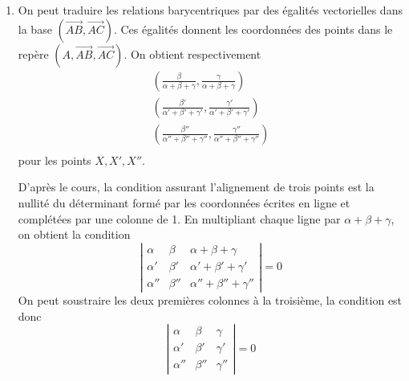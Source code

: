 \begin{enumerate}
  \item On peut traduire les relations barycentriques par des {\'e}galit{\'e}s
  vectorielles dans la base $(\overrightarrow{AB},
  \overrightarrow{AC})$. Ces {\'e}galit{\'e}s donnent les coordonn{\'e}es des
  points dans le rep{\`e}re $(A,\overrightarrow{AB},
  \overrightarrow{AC})$. On obtient respectivement
  \begin{eqnarray*}
(\frac{\beta}{\alpha+\beta+\gamma},\frac{\gamma}{\alpha+\beta+\gamma})\\
(\frac{\beta'}{\alpha'+\beta'+\gamma'},\frac{\gamma'}{\alpha'+\beta'+\gamma'})\\
(\frac{\beta''}{\alpha''+\beta''+\gamma''},\frac{\gamma''}{\alpha''+\beta''+\gamma''})\\
  \end{eqnarray*}
  pour les points $X,X',X''$.

  D'apr{\`e}s le cours, la condition assurant l'alignement de trois
  points est la nullit{\'e} du d{\'e}terminant form{\'e} par les coordonn{\'e}es
  {\'e}crites en ligne et compl{\'e}t{\'e}es par une colonne de 1. En
  multipliant chaque ligne par $\alpha+\beta+\gamma$, on obtient
  la condition
  \[\left|\begin{array}{ccc}
    \alpha & \beta & \alpha+\beta+\gamma \\
    \alpha' & \beta' & \alpha'+\beta'+\gamma' \\
    \alpha'' & \beta'' & \alpha''+\beta''+\gamma''
  \end{array}\right| = 0\]
  On peut soustraire les deux premi{\`e}res colonnes {\`a} la troisi{\`e}me,
  la condition est donc
  \[\left|\begin{array}{ccc}
    \alpha & \beta & \gamma \\
    \alpha' & \beta' & \gamma' \\
    \alpha'' & \beta'' & \gamma''
  \end{array}\right| = 0\]


\end{enumerate}

